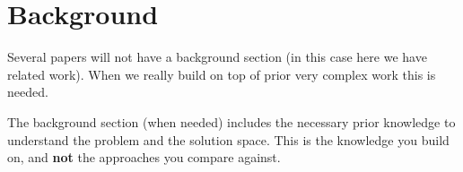 \section{Background} \label{sec:related}

Several papers will not have a background section (in this case here we have
related work). When we really build on top of prior very complex work this is
needed.

The background section (when needed) includes the necessary prior knowledge to
understand the problem and the solution space. This is the knowledge you build
on, and \textbf{not} the approaches you compare against.
